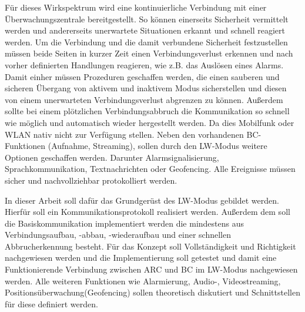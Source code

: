 \documentclass[thesis.tex]{subfiles}
\begin{document}
Für dieses Wirkspektrum wird eine kontinuierliche Verbindung mit einer Überwachungszentrale bereitgestellt.
So können einerseits Sicherheit vermittelt werden und andererseits unerwartete Situationen erkannt und schnell reagiert werden.
Um die Verbindung und die damit verbundene Sicherheit festzustellen müssen beide Seiten in kurzer Zeit einen Verbindungsverlust erkennen und nach vorher definierten Handlungen reagieren, wie z.B. das Auslösen eines Alarms.
Damit einher müssen Prozeduren geschaffen werden, die einen sauberen und sicheren Übergang von aktivem und inaktivem Modus sicherstellen und diesen von einem unerwarteten Verbindungsverlust abgrenzen zu können.
Außerdem sollte bei einem plötzlichen Verbindungsabbruch die Kommunikation so schnell wie möglich und automatisch wieder hergestellt werden.
Da dies Mobilfunk oder WLAN nativ nicht zur Verfügung stellen.
Neben den vorhandenen BC-Funktionen (Aufnahme, Streaming), sollen durch den LW-Modus weitere Optionen geschaffen werden.
Darunter Alarmsignalisierung, Sprachkommunikation, Textnachrichten oder Geofencing.
Alle Ereignisse müssen sicher und nachvollziehbar protokolliert werden.

In dieser Arbeit soll dafür das Grundgerüst des LW-Modus gebildet werden.
Hierfür soll ein Kommunikationsprotokoll realisiert werden.
Außerdem dem soll die Basiskommunikation implementiert werden die mindestens aus Verbindungsaufbau, -abbau, -wiederaufbau und einer schnellen Abbrucherkennung besteht.
Für das Konzept soll Vollständigkeit und Richtigkeit nachgewiesen werden und die Implementierung soll getestet und damit eine Funktionierende Verbindung zwischen ARC und BC im LW-Modus nachgewiesen werden.
Alle weiteren Funktionen wie Alarmierung, Audio-, Videostreaming, Positionsüberwachung(Geofencing) sollen theoretisch diskutiert und Schnittstellen für diese definiert werden.
\end{document}
